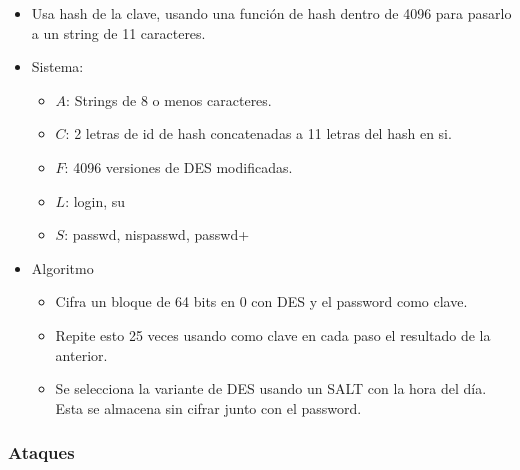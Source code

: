 \begin{itemize}
	\item Usa hash de la clave, usando una función de hash dentro de 4096 para pasarlo a un string de 11 caracteres.
	\item Sistema: \begin{itemize}
		\item $A$: Strings de 8 o menos caracteres.
		\item $C$: 2 letras de id de hash concatenadas a 11 letras del hash en si.
		\item $F$: 4096 versiones de DES modificadas.
		\item $L$: login, su
		\item $S$: passwd, nispasswd, passwd+
	\end{itemize}
	\item Algoritmo \begin{itemize}
		\item Cifra un bloque de 64 bits en 0 con DES y el password como clave.
		\item Repite esto 25 veces usando como clave en cada paso el resultado de la anterior.
		\item Se selecciona la variante de DES usando un SALT con la hora del día. Esta se almacena sin cifrar junto
		con el password.
	\end{itemize}
\end{itemize}

\subsubsection{Ataques}

